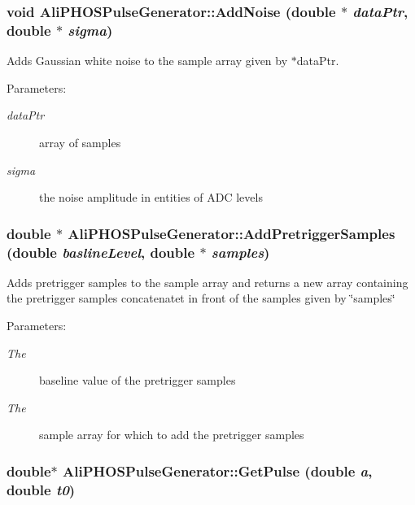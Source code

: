 \subsubsection{\setlength{\rightskip}{0pt plus 5cm}void Ali\-PHOSPulse\-Generator::Add\-Noise (double $\ast$ {\em data\-Ptr}, double $\ast$ {\em sigma})}\label{classAliPHOSPulseGenerator_a5}


Adds Gaussian white noise to the sample array given by $\ast$data\-Ptr. \begin{Desc}
\item[Parameters:]
\begin{description}
\item[{\em data\-Ptr}]array of samples \item[{\em sigma}]the noise amplitude in entities of ADC levels \end{description}
\end{Desc}
\subsubsection{\setlength{\rightskip}{0pt plus 5cm}double $\ast$ Ali\-PHOSPulse\-Generator::Add\-Pretrigger\-Samples (double {\em basline\-Level}, double $\ast$ {\em samples})}\label{classAliPHOSPulseGenerator_a4}


Adds pretrigger samples to the sample array and returns a new array containing the pretrigger samples concatenatet in front of the samples given by \char`\"{}samples\char`\"{} \begin{Desc}
\item[Parameters:]
\begin{description}
\item[{\em The}]baseline value of the pretrigger samples \item[{\em The}]sample array for which to add the pretrigger samples \end{description}
\end{Desc}
\subsubsection{\setlength{\rightskip}{0pt plus 5cm}double$\ast$ Ali\-PHOSPulse\-Generator::Get\-Pulse (double {\em a}, double {\em t0})}\label{classAliPHOSPulseGenerator_a8}


